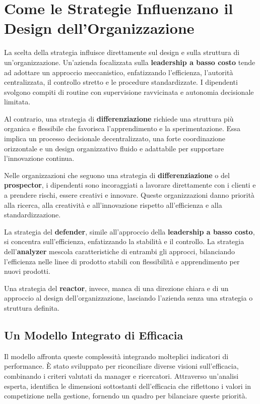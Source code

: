 \documentclass{article}
\begin{document}
\section{Come le Strategie Influenzano il Design dell'Organizzazione}
La scelta della strategia influisce direttamente sul design e sulla struttura di un’organizzazione. Un’azienda focalizzata sulla \textbf{leadership a basso costo} tende ad adottare un approccio meccanistico, enfatizzando l’efficienza, l’autorità centralizzata, il controllo stretto e le procedure standardizzate. I dipendenti svolgono compiti di routine con supervisione ravvicinata e autonomia decisionale limitata.

Al contrario, una strategia di \textbf{differenziazione} richiede una struttura più organica e flessibile che favorisca l’apprendimento e la sperimentazione. Essa implica un processo decisionale decentralizzato, una forte coordinazione orizzontale e un design organizzativo fluido e adattabile per supportare l’innovazione continua.

Nelle organizzazioni che seguono una strategia di \textbf{differenziazione} o del \textbf{prospector}, i dipendenti sono incoraggiati a lavorare direttamente con i clienti e a prendere rischi, essere creativi e innovare. Queste organizzazioni danno priorità alla ricerca, alla creatività e all’innovazione rispetto all’efficienza e alla standardizzazione.

La strategia del \textbf{defender}, simile all’approccio della \textbf{leadership a basso costo}, si concentra sull’efficienza, enfatizzando la stabilità e il controllo. La strategia dell’\textbf{analyzer} mescola caratteristiche di entrambi gli approcci, bilanciando l’efficienza nelle linee di prodotto stabili con flessibilità e apprendimento per nuovi prodotti.

Una strategia del \textbf{reactor}, invece, manca di una direzione chiara e di un approccio al design dell’organizzazione, lasciando l’azienda senza una strategia o struttura definita.


\subsection{Un Modello Integrato di Efficacia}
Il modello affronta queste complessità integrando molteplici indicatori di performance. È stato sviluppato per riconciliare diverse visioni sull’efficacia, combinando i criteri valutati da manager e ricercatori. Attraverso un’analisi esperta, identifica le dimensioni sottostanti dell’efficacia che riflettono i valori in competizione nella gestione, fornendo un quadro per bilanciare queste priorità.
\end{document}
